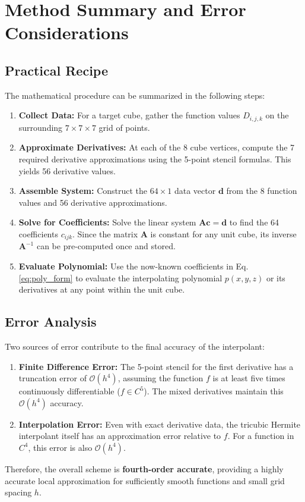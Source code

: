 \documentclass[12pt]{article}
\newcommand{\mat}[1]{\mathbf{#1}}
\newcommand{\vect}[1]{\mathbf{#1}}
\newcommand{\data}[3]{D_{#1,#2,#3}}
\begin{document}
\section{Method Summary and Error Considerations}

\subsection{Practical Recipe}
The mathematical procedure can be summarized in the following steps:
\begin{enumerate}
    \item \textbf{Collect Data:} For a target cube, gather the function values $\data{i}{j}{k}$ on the surrounding $7\times7\times7$ grid of points.
    \item \textbf{Approximate Derivatives:} At each of the 8 cube vertices, compute the 7 required derivative approximations using the 5-point stencil formulas. This yields 56 derivative values.
    \item \textbf{Assemble System:} Construct the $64 \times 1$ data vector $\vect{d}$ from the 8 function values and 56 derivative approximations.
    \item \textbf{Solve for Coefficients:} Solve the linear system $\mat{A} \vect{c} = \vect{d}$ to find the 64 coefficients $c_{ijk}$. Since the matrix $\mat{A}$ is constant for any unit cube, its inverse $\mat{A}^{-1}$ can be pre-computed once and stored.
    \item \textbf{Evaluate Polynomial:} Use the now-known coefficients in Eq. \eqref{eq:poly_form} to evaluate the interpolating polynomial $p(x,y,z)$ or its derivatives at any point within the unit cube.
\end{enumerate}

\subsection{Error Analysis}
Two sources of error contribute to the final accuracy of the interpolant:
\begin{enumerate}
    \item \textbf{Finite Difference Error:} The 5-point stencil for the first derivative has a truncation error of $\mathcal{O}(h^4)$, assuming the function $f$ is at least five times continuously differentiable ($f \in C^5$). The mixed derivatives maintain this $\mathcal{O}(h^4)$ accuracy.
    \item \textbf{Interpolation Error:} Even with exact derivative data, the tricubic Hermite interpolant itself has an approximation error relative to $f$. For a function in $C^4$, this error is also $\mathcal{O}(h^4)$.
\end{enumerate}
Therefore, the overall scheme is \textbf{fourth-order accurate}, providing a highly accurate local approximation for sufficiently smooth functions and small grid spacing $h$.
\end{document}
